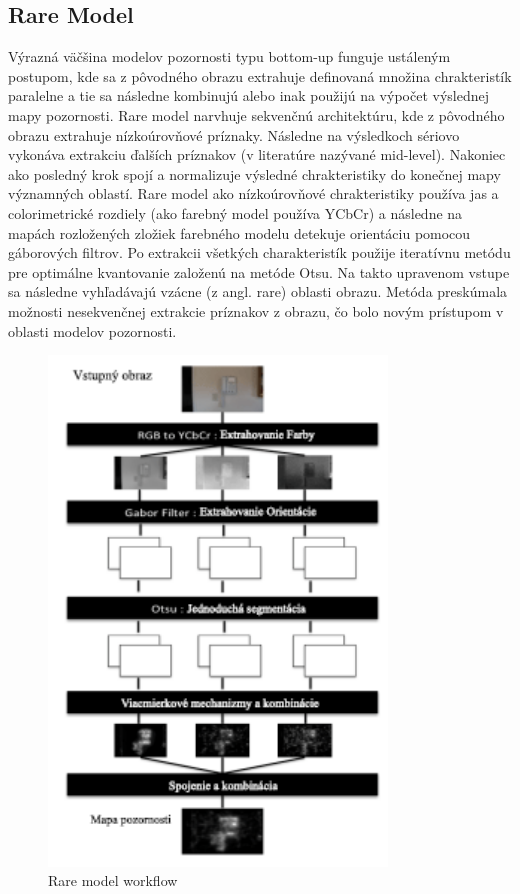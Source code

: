 \subsection{Rare Model}
Výrazná väčšina modelov pozornosti typu bottom-up funguje ustáleným postupom, kde sa z pôvodného obrazu extrahuje definovaná množina chrakteristík paralelne a tie sa následne kombinujú alebo inak použijú na výpočet výslednej mapy pozornosti.
Rare model narvhuje sekvenčnú architektúru, kde z pôvodného obrazu extrahuje nízkoúrovňové príznaky.
Následne na výsledkoch sériovo vykonáva extrakciu ďalších príznakov (v literatúre nazývané mid-level).
Nakoniec ako posledný krok spojí a normalizuje výsledné chrakteristiky do konečnej mapy významných oblastí.
Rare model ako nízkoúrovňové chrakteristiky používa jas a colorimetrické rozdiely (ako farebný model používa YCbCr) a následne na mapách rozložených zložiek farebného modelu detekuje orientáciu pomocou gáborových filtrov\cite{rare-1}.
Po extrakcii všetkých charakteristík použije iteratívnu metódu pre optimálne kvantovanie založenú na metóde Otsu\cite{otsu}.
Na takto upravenom vstupe sa následne vyhľadávajú vzácne (z angl. rare) oblasti obrazu.
Metóda preskúmala možnosti nesekvenčnej extrakcie príznakov z obrazu, čo bolo novým prístupom v oblasti modelov pozornosti.

\begin{figure}[H]
  \centering
  \includegraphics[width=9cm]{pics/rare-1.png}
  \caption{Rare model workflow\cite{rare-1}}\label{wrap-fig:3}
\end{figure}

